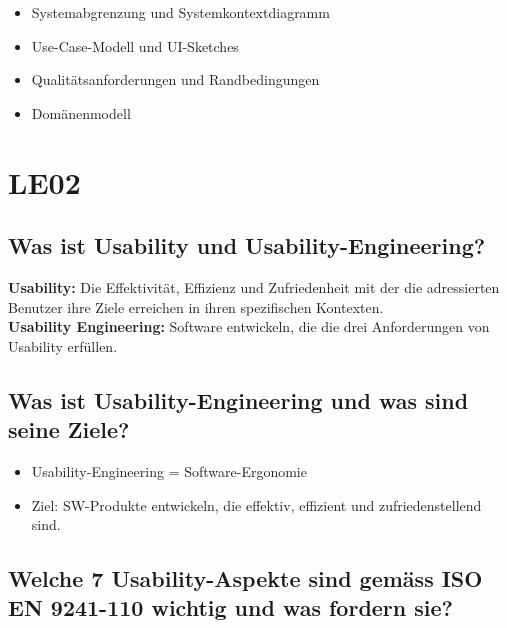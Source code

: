 \documentclass{article}
\begin{document}
\begin{itemize}
	\item Systemabgrenzung und Systemkontextdiagramm
	\item Use-Case-Modell und UI-Sketches
	\item Qualitätsanforderungen und Randbedingungen
	\item Domänenmodell
\end{itemize}




\section{LE02}

\subsection{Was ist Usability und Usability-Engineering?}

\textbf{Usability:} Die Effektivität, Effizienz und Zufriedenheit mit der die adressierten Benutzer ihre Ziele erreichen in ihren spezifischen Kontexten.\\
\textbf{Usability Engineering:} Software entwickeln, die die drei Anforderungen von Usability erfüllen.


\subsection{Was ist Usability-Engineering und was sind seine Ziele?}
\begin{itemize}
	\item Usability-Engineering = Software-Ergonomie
	\item Ziel: SW-Produkte entwickeln, die effektiv, effizient und zufriedenstellend sind.
\end{itemize}


\subsection{Welche 7 Usability-Aspekte sind gemäss ISO EN 9241-110 wichtig und was fordern sie?}
\end{document}
